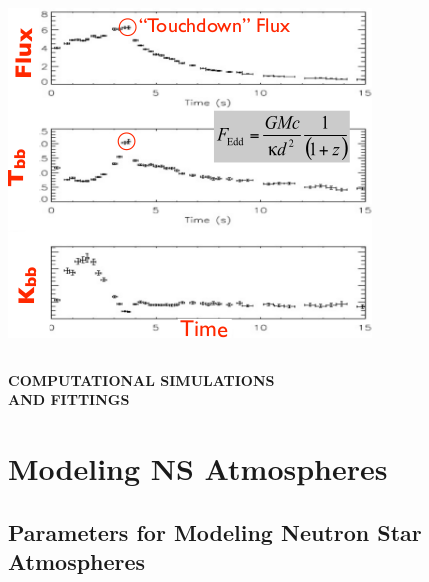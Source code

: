 \begin{frame}
\begin{columns}[c]
\begin{column}{0.7\textwidth}
\begin{center}
\includegraphics[scale=0.45]{figs/pree.png}
\end{center}

\quad 
  \end{column}
\end{columns}
   \end{frame}
   
   
 
 

\begin{frame}
\begin{center}
 
	{\bf  COMPUTATIONAL SIMULATIONS\\ AND FITTINGS} 
\end{center}

\end{frame}



\section{Modeling NS Atmospheres}

\subsection*{Parameters for Modeling Neutron Star Atmospheres}

